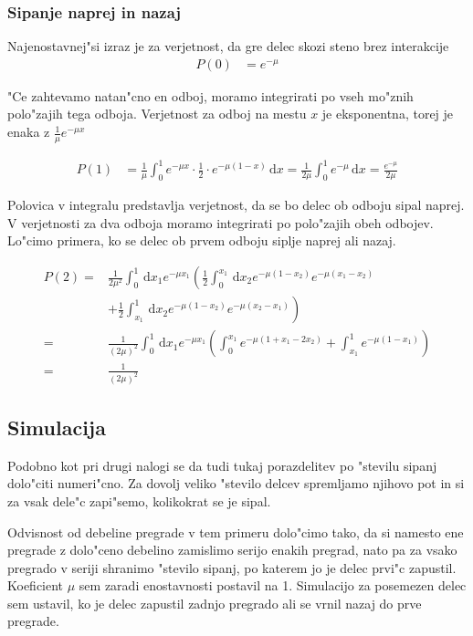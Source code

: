 \documentclass[a4paper,10pt]{article}
\newcommand{\dd}{\,\mathrm{d}}
\begin{document}
\subsubsection{Sipanje naprej in nazaj}

Najenostavnej"si izraz je za verjetnost, da gre delec skozi steno brez interakcije
\begin{align}
 P(0) &= e^{-\mu}
\end{align}

"Ce zahtevamo natan"cno en odboj, moramo integrirati po vseh mo"znih polo"zajih tega odboja. Verjetnost za odboj na mestu $x$ je eksponentna, torej je enaka z $\frac{1}{\mu}e^{-\mu x}$

\begin{align}
 P(1) &= \frac{1}{\mu} \int_0^1 e^{-\mu x} \cdot \frac{1}{2} \cdot e^{-\mu (1-x)} \dd x = \frac{1}{2\mu} \int_0^1 e^{-\mu} \dd x = \frac{e^{-\mu}}{2\mu}
\end{align}

Polovica v integralu predstavlja verjetnost, da se bo delec ob odboju sipal naprej. V verjetnosti za dva odboja moramo integrirati po polo"zajih obeh odbojev. Lo"cimo primera, ko se delec ob prvem odboju siplje naprej ali nazaj. 

\begin{align}
 P(2) = & {} \frac{1}{2\mu^2}\int_0^1 \dd x_1 e^{-\mu x_1} \left( \frac{1}{2}\int_0^{x_1} \dd x_2 e^{-\mu (1-x_2)} e^{-\mu(x_1-x_2)} \right.\\
&+ \left. \frac{1}{2}\int_{x_1}^{1} \dd x_2 e^{-\mu (1-x_2)} e^{-\mu(x_2-x_1)} \right) \\
= & {} \frac{1}{(2\mu)^2} \int_0^1\dd x_1 e^{-\mu x_1} \left( \int_0^{x_1} e^{-\mu(1 + x_1 - 2x_2)} + \int_{x_1}^1 e^{-\mu(1 - x_1)} \right) \\
= & {} \frac{1}{(2\mu)^2} \
\end{align}

\subsection{Simulacija}

Podobno kot pri drugi nalogi se da tudi tukaj porazdelitev po "stevilu sipanj dolo"citi numeri"cno. Za dovolj veliko "stevilo delcev spremljamo njihovo pot in si za vsak dele"c zapi"semo, kolikokrat se je sipal. 

Odvisnost od debeline pregrade v tem primeru dolo"cimo tako, da si namesto ene pregrade z dolo"ceno debelino zamislimo serijo enakih pregrad, nato pa za vsako pregrado v seriji shranimo "stevilo sipanj, po katerem jo je delec prvi"c zapustil. Koeficient $\mu$ sem zaradi enostavnosti postavil na 1. Simulacijo za posemezen delec sem ustavil, ko je delec zapustil zadnjo pregrado ali se vrnil nazaj do prve pregrade. 
\end{document}
